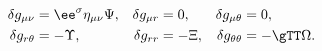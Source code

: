 \begin{equation}
\begin{aligned}
\delta g_{\mu \nu} & = \ee^\sigma \eta_{\mu \nu} \Psi, & \delta g_{\mu
r} & = 0, & \delta g_{\mu \theta} & = 0, \\ \delta g_{r \theta} & =
-\Upsilon, & \delta g_{rr} & = - \Xi, & \delta g_{\theta \theta} & =
-\gTT \Omega.
\end{aligned}
\end{equation}

